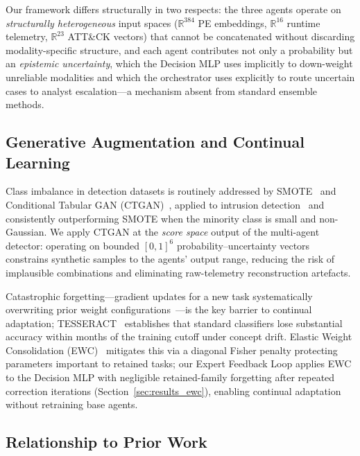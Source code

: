 \documentclass[journal]{IEEEtran}
\newcommand{\R}{\mathbb{R}}
\begin{document}
Our framework differs structurally in two respects: the three agents
operate on \emph{structurally heterogeneous} input spaces ($\R^{384}$ PE
embeddings, $\R^{16}$ runtime telemetry, $\R^{23}$ ATT\&CK vectors) that
cannot be concatenated without discarding modality-specific structure, and
each agent contributes not only a probability but an \emph{epistemic
uncertainty}, which the Decision MLP uses implicitly to down-weight
unreliable modalities and which the orchestrator uses explicitly to route
uncertain cases to analyst escalation---a mechanism absent from standard
ensemble methods.

\subsection{Generative Augmentation and Continual Learning}

Class imbalance in detection datasets is routinely addressed by
SMOTE~\cite{chawla2002smote} and Conditional Tabular GAN
(CTGAN)~\cite{xu_ctgan_2019}, applied to intrusion
detection~\cite{lin_idsgan_2022} and consistently outperforming SMOTE
when the minority class is small and non-Gaussian.
We apply CTGAN at the \emph{score space} output of the multi-agent
detector: operating on bounded $[0,1]^6$ probability--uncertainty vectors
constrains synthetic samples to the agents' output range, reducing the
risk of implausible combinations and eliminating raw-telemetry
reconstruction artefacts.

Catastrophic forgetting---gradient updates for a new task systematically
overwriting prior weight configurations~\cite{kirkpatrick_ewc_2017}---is
the key barrier to continual adaptation; TESSERACT~\cite{pendlebury_tesseract_2019}
establishes that standard classifiers lose substantial accuracy within
months of the training cutoff under concept drift.
Elastic Weight Consolidation (EWC)~\cite{kirkpatrick_ewc_2017} mitigates
this via a diagonal Fisher penalty protecting parameters important to
retained tasks; our Expert Feedback Loop applies EWC to the Decision MLP
with negligible retained-family forgetting after repeated correction
iterations (Section~\ref{sec:results_ewc}), enabling continual adaptation
without retraining base agents.

\subsection{Relationship to Prior Work}
\end{document}
